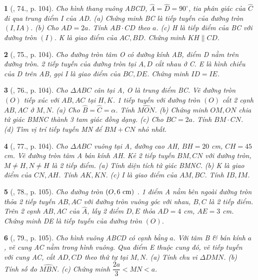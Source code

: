 \documentclass{article}
\newtheorem{baitoan}{}
\begin{document}
\begin{baitoan}[\cite{Binh_Toan_9_tap_1}, 74., p. 104]
	Cho hình thang vuông ABCD, $\widehat{A} = \widehat{D} = 90^\circ$, tia phân giác của $\widehat{C}$ đi qua trung điểm I của AD. (a) Chứng minh BC là tiếp tuyến của đường tròn $(I,IA)$. (b) Cho $AD = 2a$. Tính $AB\cdot CD$ theo $a$. (c) H là tiếp điểm của BC với đường tròn $(I)$. K là giao điểm của $AC,BD$. Chứng minh $KH\parallel CD$.
\end{baitoan}

\begin{baitoan}[\cite{Binh_Toan_9_tap_1}, 75., p. 104]
	Cho đường tròn tâm O có đường kính AB, điểm D nằm trên đường tròn. 2 tiếp tuyến của đường tròn tại $A,D$ cắt nhau ở C. E là hình chiếu của D trên AB, gọi I là giao điểm của $BC,DE$. Chứng minh $ID = IE$.
\end{baitoan}

\begin{baitoan}[\cite{Binh_Toan_9_tap_1}, 76., p. 104]
	Cho $\Delta ABC$ cân tại A, O là trung điểm BC. Vẽ đường tròn $(O)$ tiếp xúc với $AB,AC$ tại $H,K$. 1 tiếp tuyến với đường tròn $(O)$ cắt 2 cạnh $AB,AC$ ở $M,N$. (a) Cho $\widehat{B} = \widehat{C} = \alpha$. Tính $\widehat{MON}$. (b) Chứng minh $OM,ON$ chia tứ giác BMNC thành 3 tam giác đồng dạng. (c) Cho $BC = 2a$. Tính $BM\cdot CN$. (d) Tìm vị trí tiếp tuyến MN để $BM + CN$ nhỏ nhất.
\end{baitoan}

\begin{baitoan}[\cite{Binh_Toan_9_tap_1}, 77., p. 104]
	Cho $\Delta ABC$ vuông tại A, đường cao AH, $BH = 20$ {\rm cm}, $CH = 45$ {\rm cm}. Vẽ đường tròn tâm A bán kính AH. Kẻ 2 tiếp tuyến $BM,CN$ với đường tròn, $M\ne H,N\ne H$ là 2 tiếp điểm. (a) Tính diện tích tứ giác BMNC. (b) K là giao điểm của $CN,AH$. Tính $AK,KN$. (c) I là giao điểm của $AM,BC$. Tính $IB,IM$.
\end{baitoan}

\begin{baitoan}[\cite{Binh_Toan_9_tap_1}, 78., p. 105]
	Cho đường tròn $(O,6\ {\rm cm})$ . 1 điểm A nằm bên ngoài đường tròn thỏa 2 tiếp tuyến $AB,AC$ với đường tròn vuông góc với nhau, $B,C$ là 2 tiếp điểm. Trên 2 cạnh $AB,AC$ của $\widehat{A}$, lấy 2 điểm $D,E$ thỏa $AD = 4$ {\rm cm}, $AE = 3$ {\rm cm}. Chứng minh DE là tiếp tuyến của đường tròn $(O)$.
\end{baitoan}

\begin{baitoan}[\cite{Binh_Toan_9_tap_1}, 79., p. 105]
	Cho hình vuông ABCD có cạnh bằng $a$. Với tâm B \& bán kính $a$, vẽ cung AC nằm trong hình vuông. Qua điểm E thuộc cung đó, vẽ tiếp tuyến với cung AC, cắt $AD,CD$ theo thứ tự tại $M,N$. (a) Tính chu vi $\Delta DMN$. (b) Tính số đo $\widehat{MBN}$. (c) Chứng minh $\dfrac{2a}{3} < MN < a$.
\end{baitoan}
\end{document}
